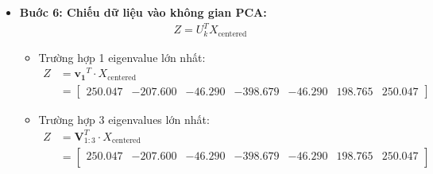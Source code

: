 \begin{itemize}
\begin{itemize}
\begin{align*}
                                \mathbf{V}_{1:3} = 
                                \begin{bmatrix}
                                -0.274 & -0.102 & -0.502 \\
                                -0.417 & -0.416 & -0.003 \\
                                -0.481 & 0.273 & 0.383 \\
                                -0.201 & 0.696 & -0.450 \\
                                -0.481 & 0.273 & 0.383 \\
                                -0.417 & -0.416 & -0.003 \\
                                -0.274 & -0.102 & -0.502
                                \end{bmatrix}
                            \end{align*}
                    \end{itemize}
                \item \textbf{Buớc 6: Chiếu dữ liệu vào không gian PCA:}
                    \begin{align}
                        Z = U_k^T X_{\text{centered}}
                    \end{align}
                    \begin{itemize}
                        \item Trường hợp 1 eigenvalue lớn nhất:
                            \begin{align*}
                                Z &= \mathbf{v_1}^T \cdot X_{\text{centered}} \nonumber \\
                                &= \begin{bmatrix}
                                250.047 & -207.600 & -46.290 & -398.679 & -46.290 & 198.765 & 250.047
                                \end{bmatrix}
                            \end{align*}
                        \item Trường hợp 3 eigenvalues lớn nhất:
                            \begin{align*}
                                Z &= \mathbf{V}_{1:3}^T \cdot X_{\text{centered}} \nonumber \\
                                &= \begin{bmatrix}
                                250.047 & -207.600 & -46.290 & -398.679 & -46.290 & 198.765 & 250.047 \\

\end{bmatrix}
\end{align*}
\end{itemize}
\end{itemize}
